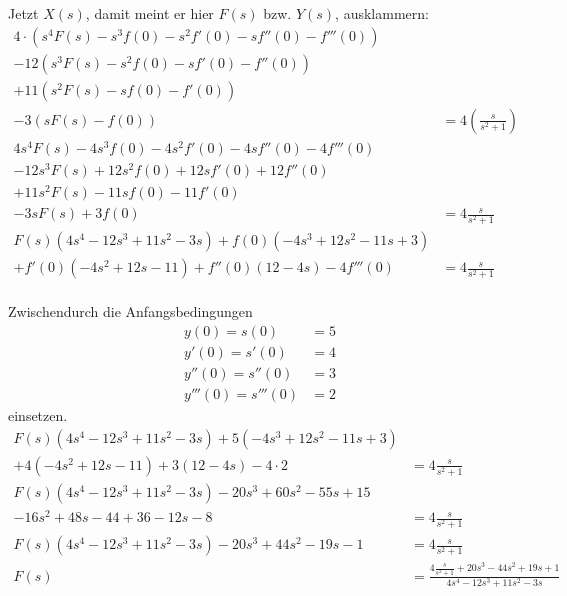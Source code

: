 \documentclass[%
	paper=a4,%
	pagesize=auto	%
	]{scrartcl}
\begin{document}
	Jetzt \(X(s)\), damit meint er hier \(F(s)\) bzw. \(Y(s)\), ausklammern:
\begin{align*}
	4 \cdot \left(s^4 F(s) -s^3 f(0) - s^2 f'(0) - sf''(0) - f'''(0)\right)\\
		- 12 \left(s^3 F(s) - s^2 f(0) - sf'(0) - f''(0)\right)\\
		+ 11 \left(s^2 F(s) - sf(0) - f'(0)\right)\\
		- 3 \left(s F(s) - f(0)\right)
		& = 4 \left(\frac{s}{s^2 + 1}\right)\\
	4 s^4 F(s) - 4 s^3 f(0) - 4 s^2 f'(0) - 4 sf''(0) - 4 f'''(0)\\
		- 12 s^3 F(s) + 12 s^2 f(0) + 12 sf'(0) + 12 f''(0)\\
		+ 11 s^2 F(s) - 11 s f(0) - 11 f'(0)\\
		- 3 s F(s) + 3 f(0)
		& = 4 \frac{s}{s^2 + 1}\\
	F(s) \left(4 s^4 - 12 s^3 + 11 s^2 - 3 s\right)
		+ f(0) \left(- 4 s^3 + 12 s^2 - 11 s + 3\right)\\
		+ f'(0) \left(- 4 s^2 + 12 s - 11\right)
		+ f''(0) \left(12 - 4s\right)
		- 4 f'''(0)
		& = 4 \frac{s}{s^2 + 1}\\
\end{align*}

Zwischendurch die Anfangsbedingungen
\begin{align*}
	y(0) = s(0) &= 5\\
	y'(0) = s'(0) &= 4\\
	y''(0) = s''(0) &= 3\\
	y'''(0) = s'''(0) &= 2
\end{align*}
einsetzen.
\begin{align*}
	F(s) \left(4 s^4 - 12 s^3 + 11 s^2 - 3 s\right)
		+ 5 \left(- 4 s^3 + 12 s^2 - 11 s + 3\right)\\
		+ 4 \left(- 4 s^2 + 12 s - 11\right)
		+ 3 \left(12 - 4s\right)
		- 4 \cdot 2
		& = 4 \frac{s}{s^2 + 1}\\
	F(s) \left(4 s^4 - 12 s^3 + 11 s^2 - 3 s\right)
		- 20 s^3 + 60 s^2 - 55 s + 15\\
		- 16 s^2 + 48 s - 44
		+ 36 - 12s
		- 8
		& = 4 \frac{s}{s^2 + 1}\\
	F(s) \left(4 s^4 - 12 s^3 + 11 s^2 - 3 s\right)
		- 20 s^3
		+ 44 s^2
		- 19 s
		- 1
		& = 4 \frac{s}{s^2 + 1}\\
	F(s)
		& = \frac{4 \frac{s}{s^2 + 1}
		+ 20 s^3
		- 44 s^2
		+ 19 s
		+ 1
		}{
			4 s^4 - 12 s^3 + 11 s^2 - 3 s
		}
		\\
\end{align*}
\end{document}
